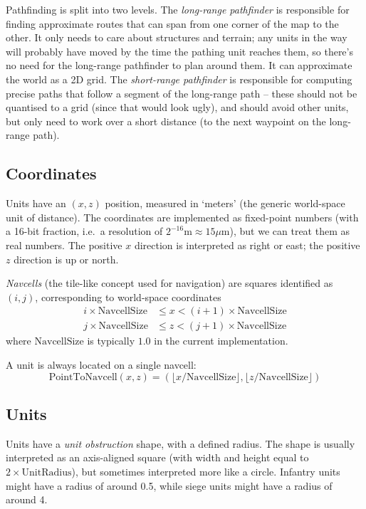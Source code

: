 \documentclass[a4paper,10pt]{article}
\begin{document}
Pathfinding is split into two levels.
The \emph{long-range pathfinder} is responsible for finding approximate routes
that can span from one corner of the map to the other.
It only needs to care about structures and terrain;
any units in the way will probably have moved by the time the pathing unit reaches them,
so there's no need for the long-range pathfinder to plan around them.
It can approximate the world as a 2D grid.
The \emph{short-range pathfinder} is responsible for computing precise paths
that follow a segment of the long-range path --
these should not be quantised to a grid (since that would look ugly),
and should avoid other units,
but only need to work over a short distance (to the next waypoint on the long-range path).

\subsection{Coordinates}

Units have an $(x, z)$ position, measured in `meters' (the generic world-space unit of distance).
The coordinates are implemented as fixed-point numbers
(with a 16-bit fraction, i.e.\ a resolution of $2^{-16}\mathrm{m} \approx 15\mu\mathrm{m}$),
but we can treat them as real numbers.
The positive $x$ direction is interpreted as right or east; the positive $z$ direction is up or north.

\emph{Navcells} (the tile-like concept used for navigation)
are squares identified as $(i, j)$,
corresponding to world-space coordinates
\begin{align*}
i \times \mathrm{NavcellSize} & \leq x < (i+1) \times \mathrm{NavcellSize} \\
j \times \mathrm{NavcellSize} & \leq z < (j+1) \times \mathrm{NavcellSize}
\end{align*}
where $\mathrm{NavcellSize}$ is typically $1.0$ in the current implementation.

A unit is always located on a single navcell:
\[
\mathrm{PointToNavcell}(x, z) = (\lfloor x / \mathrm{NavcellSize} \rfloor, \lfloor z / \mathrm{NavcellSize} \rfloor)
\]

\subsection{Units}

Units have a \emph{unit obstruction} shape,
with a defined radius.
The shape is usually interpreted as an axis-aligned square
(with width and height equal to $2\times\mathrm{UnitRadius}$),
but sometimes interpreted more like a circle.
Infantry units might have a radius of around 0.5,
while siege units might have a radius of around 4.
\end{document}
